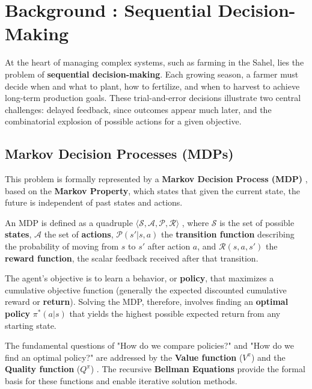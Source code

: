 \documentclass[conference]{IEEEtran}
\begin{document}
\section{Background : Sequential Decision-Making}
\label{background}

At the heart of managing complex systems, such as farming in the Sahel, lies the problem of \textbf{sequential decision-making}. Each growing season, a farmer must decide when and what to plant, how to fertilize, and when to harvest to achieve long-term production goals. These trial-and-error decisions illustrate two central challenges: delayed feedback, since outcomes appear much later, and the combinatorial explosion of possible actions for a given objective.

\subsection{Markov Decision Processes (MDPs)}

This problem is formally represented by a \textbf{Markov Decision Process (MDP)} \cite{putermanMarkovDecisionProcesses2005}, based on the \textbf{Markov Property}, which states that given the current state, the future is independent of past states and actions.

An MDP is defined as a quadruple $\langle \mathcal{S}, \mathcal{A}, \mathcal{P}, \mathcal{R} \rangle$ \cite{suttonReinforcementLearningIntroduction2014}, where $\mathcal{S}$ is the set of possible \textbf{states}, $\mathcal{A}$ the set of \textbf{actions}, $\mathcal{P}(s'|s,a)$ the \textbf{transition function} describing the probability of moving from $s$ to $s'$ after action $a$, and $\mathcal{R}(s,a,s')$ the \textbf{reward function}, the scalar feedback received after that transition.

The agent's objective is to learn a behavior, or \textbf{policy}, that maximizes a cumulative objective function (generally the expected discounted cumulative reward or \textbf{return}). Solving the MDP, therefore, involves finding an \textbf{optimal policy} $\pi^{*}(a|s)$ that yields the highest possible expected return from any starting state.

The fundamental questions of "How do we compare policies?" and "How do we find an optimal policy?" are addressed by the \textbf{Value function} ($V^{\pi}$) and the \textbf{Quality function} ($Q^{\pi}$) \cite{suttonReinforcementLearningIntroduction2014}. The recursive \textbf{Bellman Equations} provide the formal basis for these functions and enable iterative solution methods.
\end{document}
